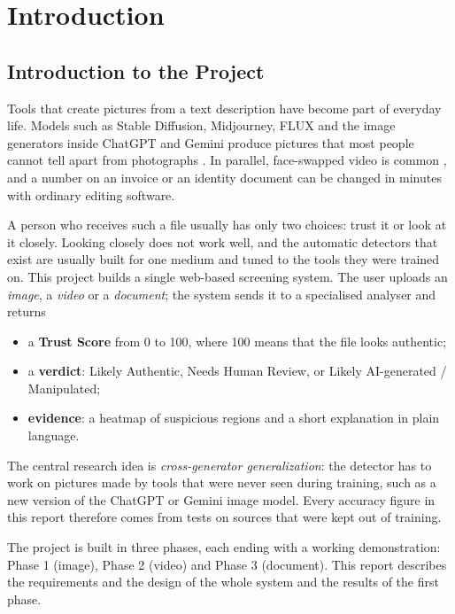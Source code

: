 \chapter{Introduction}

\section{Introduction to the Project}
Tools that create pictures from a text description have become part of everyday life. Models such as Stable Diffusion, Midjourney, FLUX and the image generators inside ChatGPT and Gemini produce pictures that most people cannot tell apart from photographs \cite{rombach}. In parallel, face-swapped video is common \cite{rossler}, and a number on an invoice or an identity document can be changed in minutes with ordinary editing software.

A person who receives such a file usually has only two choices: trust it or look at it closely. Looking closely does not work well, and the automatic detectors that exist are usually built for one medium and tuned to the tools they were trained on. This project builds a single web-based screening system. The user uploads an \emph{image}, a \emph{video} or a \emph{document}; the system sends it to a specialised analyser and returns

\begin{itemize}
  \item a \textbf{Trust Score} from 0 to 100, where 100 means that the file looks authentic;
  \item a \textbf{verdict}: Likely Authentic, Needs Human Review, or Likely AI-generated / Manipulated;
  \item \textbf{evidence}: a heatmap of suspicious regions and a short explanation in plain language.
\end{itemize}

The central research idea is \emph{cross-generator generalization}: the detector has to work on pictures made by tools that were never seen during training, such as a new version of the ChatGPT or Gemini image model. Every accuracy figure in this report therefore comes from tests on sources that were kept out of training.

The project is built in three phases, each ending with a working demonstration: Phase 1 (image), Phase 2 (video) and Phase 3 (document). This report describes the requirements and the design of the whole system and the results of the first phase.

